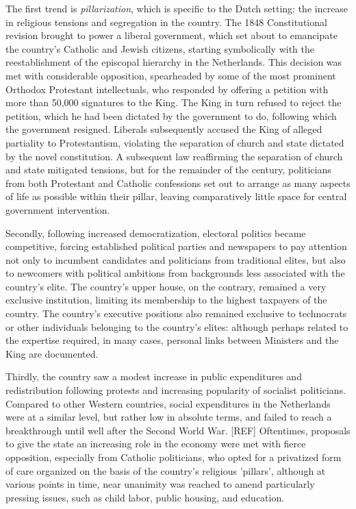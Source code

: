     The first trend is \textit{pillarization}, which is specific to the Dutch setting: the increase in religious tensions and segregation in the country. The 1848 Constitutional revision brought to power a liberal government, which set about to emancipate the country's Catholic and Jewish citizens, starting symbolically with the reestablishment of the episcopal hierarchy in the Netherlands. This decision was met with considerable opposition, spearheaded by some of the most prominent Orthodox Protestant intellectuals, who responded by offering a petition with more than 50,000 signatures to the King. The King in turn refused to reject the petition, which he had been dictated by the government to do, following which the government resigned. \autocite{oud1961honderd} Liberals subsequently accused the King of alleged partiality to Protestantism, violating the separation of church and state dictated by the novel constitution. A subsequent law reaffirming the separation of church and state mitigated tensions, but for the remainder of the century, politicians from both Protestant and Catholic confessions set out to arrange as many aspects of life as possible within their pillar, leaving comparatively little space for central government intervention. \autocite{van2013eerste}

    Secondly, following increased democratization, electoral politics became competitive, forcing established political parties and newspapers to pay attention not only to incumbent candidates and politicians from traditional elites, but also to newcomers with political ambitions from backgrounds less associated with the country's elite. The country's upper house, on the contrary, remained a very exclusive institution, limiting its membership to the highest taxpayers of the country. The country's executive positions also remained exclusive to technocrats or other individuals belonging to the country's elites: although perhaps related to the expertise required, in many cases, personal links between Ministers and the King are documented. \autocite{secker1991ministers}

    Thirdly, the country saw a modest increase in public expenditures and redistribution following protests and increasing popularity of socialist politicians. Compared to other Western countries, social expenditures in the Netherlands were at a similar level, but rather low in absolute terms, and failed to reach a breakthrough until well after the Second World War. [REF] Oftentimes, proposals to give the state an increasing role in the economy were met with fierce opposition, especially from Catholic politicians, who opted for a privatized form of care organized on the basis of the country's religious 'pillars', although at various points in time, near unanimity was reached to amend particularly pressing issues, such as child labor, public housing, and education. \autocite{van2013eerste}


